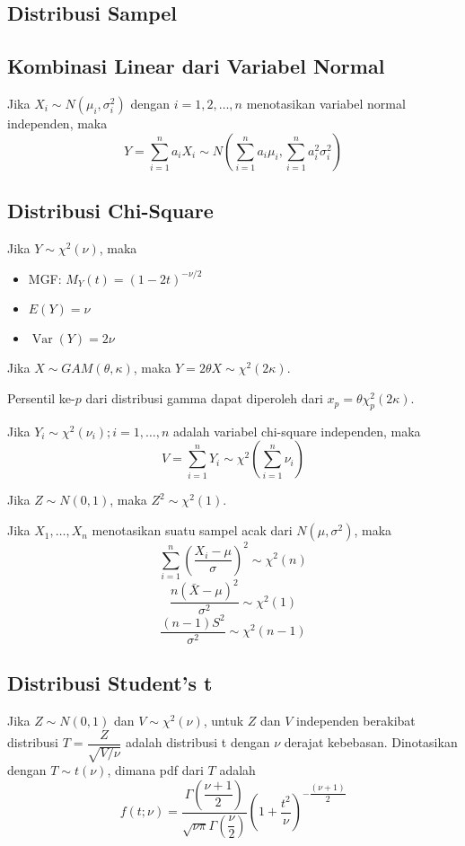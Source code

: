 \documentclass[a4paper,extrafontsizes, 9pt]{memoir}
\DeclareMathOperator{\Var}{Var}
\begin{document}
\begin{multicols}{3}
            \section*{\small Distribusi Sampel}
            \subsection*{\small Kombinasi Linear dari Variabel Normal}
                Jika $X_i\sim N(\mu_i,\sigma_i^2)$ dengan $i=1,2,\dots,n$ menotasikan variabel normal independen, maka
                \[Y=\sum_{i=1}^{n}a_iX_i\sim N\left(\sum_{i=1}^{n}a_i\mu_i,\sum_{i=1}^{n}a_i^2\sigma_i^2\right)\]
            \subsection*{\small Distribusi Chi-Square}
                Jika $Y\sim\chi^2(\nu)$, maka
                \begin{itemize}
                    \item MGF: $M_Y(t)=(1-2t)^{-\nu/2}$
                    \item $E(Y)=\nu$
                    \item $\Var(Y)=2\nu$
                \end{itemize}
                Jika $X\sim GAM(\theta,\kappa)$, maka $Y=2\theta X\sim\chi^2(2\kappa)$.

                Persentil ke-$p$ dari distribusi gamma dapat diperoleh dari $x_p=\theta\chi^2_p(2\kappa)$.

                Jika $Y_i\sim\chi^2(\nu_i);i=1,\dots,n$ adalah variabel chi-square independen, maka
                \[V=\sum_{i=1}^{n}Y_i\sim\chi^2\left(\sum_{i=1}^{n}\nu_i\right)\]

                Jika $Z\sim N(0,1)$, maka $Z^2\sim\chi^2(1)$.

                Jika $X_1,\dots,X_n$ menotasikan suatu sampel acak dari $N(\mu,\sigma^2)$, maka
                \[\sum_{i=1}^{n}\left(\dfrac{X_i-\mu}{\sigma}\right)^2\sim\chi^2(n)\]
                \[\frac{n(\bar{X}-\mu)^2}{\sigma^2}\sim\chi^2(1)\]
                \[\dfrac{(n-1)S^2}{\sigma^2}\sim\chi^2(n-1)\]
            \subsection*{\small Distribusi Student's t}
                Jika $Z\sim N(0,1)$ dan $V\sim\chi^2(\nu)$, untuk $Z$ dan $V$ independen berakibat distribusi $\displaystyle T=\dfrac{Z}{\sqrt{V/\nu}}$ adalah distribusi t dengan $\nu$ derajat kebebasan. Dinotasikan dengan $T\sim t(\nu)$, dimana pdf dari $T$ adalah
                \[f(t;\nu)=\dfrac{\Gamma\left(\dfrac{\nu+1}{2}\right)}{\sqrt{\nu\pi}\Gamma\left(\dfrac{\nu}{2}\right)}\left(1+\dfrac{t^2}{\nu}\right)^{-\dfrac{(\nu+1)}{2}}\]


\end{multicols}
\end{document}

